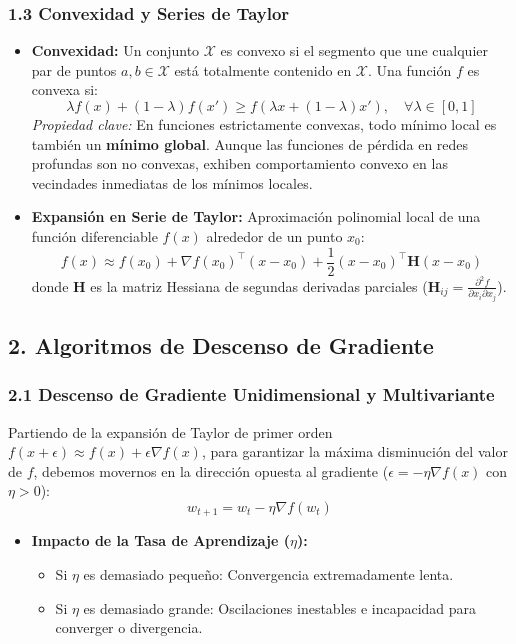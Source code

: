 \subsubsection{1.3 Convexidad y Series de Taylor}

\begin{itemize}
	\item \textbf{Convexidad:} Un conjunto $\mathcal{X}$ es convexo si el segmento que une cualquier par de puntos $a, b \in \mathcal{X}$ está totalmente contenido en $\mathcal{X}$. Una función $f$ es convexa si:
	$$\lambda f(x) + (1-\lambda)f(x') \ge f(\lambda x + (1-\lambda)x'), \quad \forall \lambda \in [0, 1]$$
	\emph{Propiedad clave:} En funciones estrictamente convexas, todo mínimo local es también un \textbf{mínimo global}. Aunque las funciones de pérdida en redes profundas son no convexas, exhiben comportamiento convexo en las vecindades inmediatas de los mínimos locales.
	
	\item \textbf{Expansión en Serie de Taylor:} Aproximación polinomial local de una función diferenciable $f(x)$ alrededor de un punto $x_0$:
	$$f(x) \approx f(x_0) + \nabla f(x_0)^\top (x - x_0) + \frac{1}{2}(x - x_0)^\top \mathbf{H}(x - x_0)$$
	donde $\mathbf{H}$ es la matriz Hessiana de segundas derivadas parciales ($\mathbf{H}_{ij} = \frac{\partial^2 f}{\partial x_i \partial x_j}$).
\end{itemize}

\subsection{2. Algoritmos de Descenso de Gradiente}

\subsubsection{2.1 Descenso de Gradiente Unidimensional y Multivariante}

Partiendo de la expansión de Taylor de primer orden $f(x + \epsilon) \approx f(x) + \epsilon \nabla f(x)$, para garantizar la máxima disminución del valor de $f$, debemos movernos en la dirección opuesta al gradiente ($\epsilon = -\eta \nabla f(x)$ con $\eta > 0$):
$$w_{t+1} = w_t - \eta \nabla f(w_t)$$

\begin{itemize}
	\item \textbf{Impacto de la Tasa de Aprendizaje ($\eta$):}
	\begin{itemize}
		\item Si $\eta$ es demasiado pequeño: Convergencia extremadamente lenta.
		\item Si $\eta$ es demasiado grande: Oscilaciones inestables e incapacidad para converger o divergencia.
	\end{itemize}
\end{itemize}

